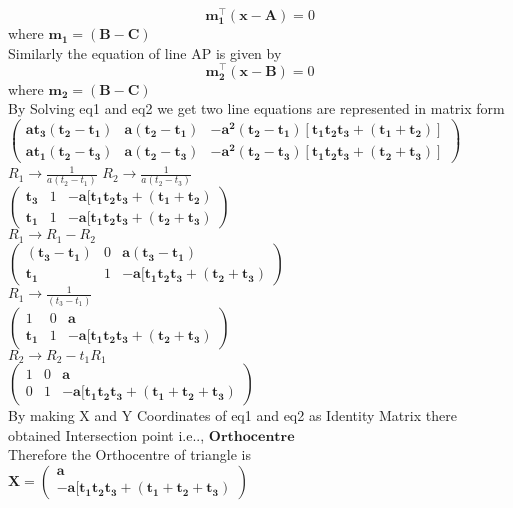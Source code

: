 \documentclass[journal,12pt,twocolumn]{IEEEtran}
\newcommand{\myvec}[1]{\ensuremath{\begin{pmatrix}#1\end{pmatrix}}}
\let\vec\mathbf
\begin{document}
\begin{equation}
 \vec{m_1^{\top}}(\vec{{x}-{A}}) = 0  
\end{equation}
where $\vec{m_1} = \vec{(B-C)}$ \\
Similarly the equation of line AP is given by\\
\begin{equation}
 \vec{m_2^{\top}}(\vec{{x}-B}) = 0   \label{eq-3}
\end{equation}
where $\vec{m_2} = \vec{(B-C)}$ \\
By Solving eq1 and eq2 we get two line equations are represented in matrix form \\
$\myvec{\vec{at_3(t_2-t_1)} & \vec{a(t_2-t_1)} & \vec{-a^2(t_2-t_1)[t_1t_2t_3 + (t_1+t_2)]} \\ \vec{at_1(t_2-t_3)} & \vec{a(t_2-t_3)} & \vec{-a^2(t_2-t_3)[t_1t_2t_3 + (t_2+t_3)]}}$\\
$R_1 \rightarrow \frac{1}{a(t_2-t_1)}$ 
$R_2 \rightarrow \frac{1}{a(t_2-t_3)}$\\
$\myvec{\vec{t_3} & 1 & \vec{-a[t_1t_2t_3 + (t_1+t_2)} \\ \vec{t_1}& 1 &\vec{-a[t_1t_2t_3 + (t_2+t_3)}}$\\
 $R_1 \rightarrow {R_1-R_2}$\\
$\myvec{\vec{(t_3-t_1)} & 0 & \vec{a(t_3-t_1)} \\ \vec{t_1}& 1 & \vec{-a[t_1t_2t_3 + (t_2+t_3)}}$\\
$R_1 \rightarrow \frac{1}{(t_3-t_1)}$ \\
$\myvec{1 & 0 & \vec{a} \\ \vec{t_1} & 1 &\vec{-a[t_1t_2t_3 + (t_2+t_3)}}$\\
$R_2 \rightarrow {R_2-t_1R_1}$\\
$\myvec{1 &0 & \vec{a} \\  0& 1 & \vec{-a[t_1t_2t_3 + (t_1+t_2+t_3)}}$\\
By making X and Y Coordinates of eq1 and eq2 as Identity Matrix there obtained Intersection point i.e.., $\vec{Orthocentre}$\\
Therefore the Orthocentre of triangle is\\
$\vec{X} =\myvec{\vec{a}\\ \vec{-a[t_1t_2t_3 + (t_1+t_2+t_3)}}$
\end{document}
